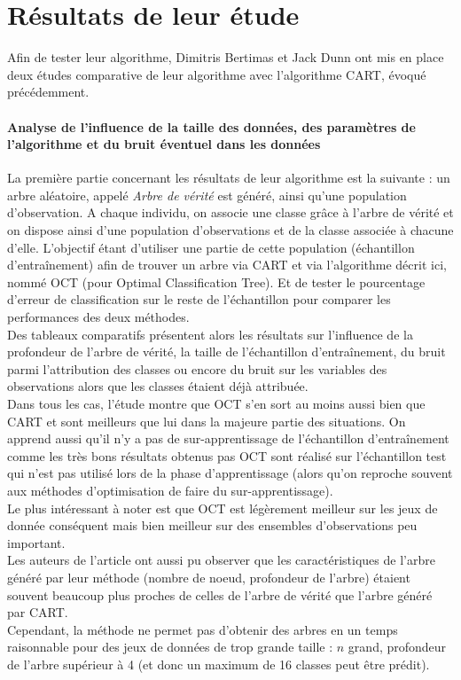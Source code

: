 \documentclass[12pt]{report}
\begin{document}
\section{Résultats de leur étude}
Afin de tester leur algorithme, Dimitris Bertimas et Jack Dunn ont mis en place deux études comparative de leur algorithme avec l'algorithme CART, évoqué précédemment.

\paragraph{Analyse de l'influence de la taille des données, des paramètres de l'algorithme et du bruit éventuel dans les données} La première partie concernant les résultats de leur algorithme est la suivante : un arbre aléatoire, appelé \textit{Arbre de vérité} est généré, ainsi qu'une population d'observation. A chaque individu, on associe une classe grâce à l'arbre de vérité et on dispose ainsi d'une population d'observations et de la classe associée à chacune d'elle. L'objectif étant d'utiliser une partie de cette population (échantillon d'entraînement) afin de trouver un arbre via CART et via l'algorithme décrit ici, nommé OCT (pour Optimal Classification Tree).
Et de tester le pourcentage d'erreur de classification sur le reste de l'échantillon pour comparer les performances des deux méthodes.\\
Des tableaux comparatifs présentent alors les résultats sur l'influence de la profondeur de l'arbre de vérité, la taille de l'échantillon d'entraînement, du bruit parmi l'attribution des classes ou encore du bruit sur les variables des observations alors que les classes étaient déjà attribuée.\\
Dans tous les cas, l'étude montre que OCT s'en sort au moins aussi bien que CART et sont meilleurs que lui dans la majeure partie des situations. On apprend aussi qu'il n'y a pas de sur-apprentissage de l'échantillon d'entraînement comme les très bons résultats obtenus pas OCT sont réalisé sur l'échantillon test qui n'est pas utilisé lors de la phase d'apprentissage (alors qu'on reproche souvent aux méthodes d'optimisation de faire du sur-apprentissage).\\
Le plus intéressant à noter est que OCT est légèrement meilleur sur les jeux de donnée conséquent mais bien meilleur sur des ensembles d'observations peu important.\\
Les auteurs de l'article ont aussi pu observer que les caractéristiques de l'arbre généré par leur méthode (nombre de noeud, profondeur de l'arbre) étaient souvent beaucoup plus proches de celles de l'arbre de vérité que l'arbre généré par CART.\\
Cependant, la méthode ne permet pas d'obtenir des arbres en un temps raisonnable pour des jeux de données de trop grande taille : \(n\) grand, profondeur de l'arbre supérieur à 4 (et donc un maximum de 16 classes peut être prédit).
\end{document}
